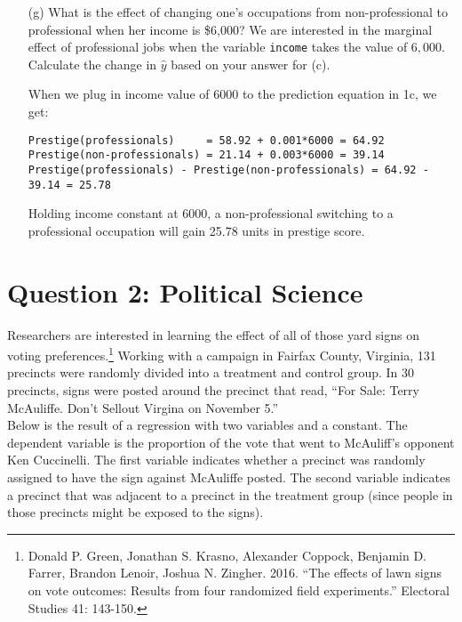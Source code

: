 \documentclass[12pt,letterpaper]{article}
\begin{document}
\begin{enumerate}
	\item [(g)]
	What is the effect of changing one's occupations from non-professional to professional when her income is \$6,000? We are interested in the marginal effect of professional jobs when the variable \texttt{income} takes the value of $6,000$. Calculate the change in $\hat{y}$ based on your answer for (c).

\noindent When we plug in income value of 6000 to the prediction equation in 1c, we get:
\begin{verbatim}
Prestige(professionals)     = 58.92 + 0.001*6000 = 64.92
Prestige(non-professionals) = 21.14 + 0.003*6000 = 39.14
Prestige(professionals) - Prestige(non-professionals) = 64.92 - 39.14 = 25.78
\end{verbatim}
\noindent Holding income constant at $6000$, a non-professional switching to a professional occupation will gain 25.78 units in prestige score.
	
\end{enumerate}

\newpage

\section*{Question 2: Political Science}
\vspace{.25cm}
\noindent 	Researchers are interested in learning the effect of all of those yard signs on voting preferences.\footnote{Donald P. Green, Jonathan	S. Krasno, Alexander Coppock, Benjamin D. Farrer,	Brandon Lenoir, Joshua N. Zingher. 2016. ``The effects of lawn signs on vote outcomes: Results from four randomized field experiments.'' Electoral Studies 41: 143-150. } Working with a campaign in Fairfax County, Virginia, 131 precincts were randomly divided into a treatment and control group. In 30 precincts, signs were posted around the precinct that read, ``For Sale: Terry McAuliffe. Don't Sellout Virgina on November 5.'' \\

Below is the result of a regression with two variables and a constant.  The dependent variable is the proportion of the vote that went to McAuliff's opponent Ken Cuccinelli. The first variable indicates whether a precinct was randomly assigned to have the sign against McAuliffe posted. The second variable indicates
a precinct that was adjacent to a precinct in the treatment group (since people in those precincts might be exposed to the signs).  \\
\end{document}
